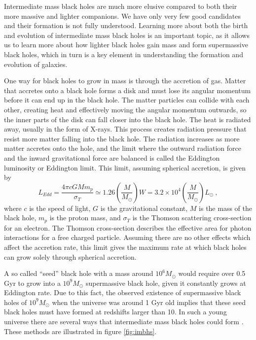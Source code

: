 \documentclass[english, oneside]{HYgradu}
\begin{document}
Intermediate mass black holes are much more elusive compared to both their more massive and lighter companions. We have only very few good candidates and their formation is not fully understood. Learning more about both the birth and evolution of intermediate mass black holes is an important topic, as it allows us to learn more about how lighter black holes gain mass and form supermassive black holes, which in turn is a key element in understanding the formation and evolution of galaxies.

One way for black holes to grow in mass is through the accretion of gas. Matter that accretes onto a black hole forms a disk and must lose its angular momentum before it can end up in the black hole. The matter particles can collide with each other, creating heat and effectively moving the angular momentum outwards, so the inner parts of the disk can fall closer into the black hole. The heat is radiated away, usually in the form of X-rays. This process creates radiation pressure that resist more matter falling into the black hole. The radiation increases as more matter accretes onto the hole, and the limit where the outward radiation force and the inward gravitational force are balanced is called the Eddington luminosity or Eddington limit. This limit, assuming spherical accretion, is given by
\begin{equation}
L_{Edd} = \frac{4 \pi c G M m_p}{\sigma_T} \simeq 1.26 \left( \frac{M}{M_\odot} \right) W = 3.2 \times 10^4 \left( \frac{M}{M_\odot} \right) L_\odot \ ,
\end{equation}
where $c$ is the speed of light, $G$ is the gravitational constant, $M$ is the mass of the black hole, $m_p$ is the proton mass, and $\sigma_T$ is the Thomson scattering cross-section for an electron. The Thomson cross-section describes the effective area for photon interactions for a free charged particle. Assuming there are no other effects which affect the accretion rate, this limit gives the maximum rate at which black holes can grow solely through spherical accretion. 

A so called ``seed'' black hole with a mass around $10^6 M_\odot$ would require over 0.5 Gyr to grow into a $10^9 M_\odot$ supermassive black hole, given it constantly grows at Eddington rate. Due to this fact, the observed existence of supermassive black holes of $10^9 M_\odot$ when the universe was around 1 Gyr old implies that these seed black holes must have formed at redshifts larger than 10. In such a young universe there are several ways that intermediate mass black holes could form \citep{mezcua:2017}. These methods are illustrated in figure \ref{fig:imbhs}.
\end{document}
